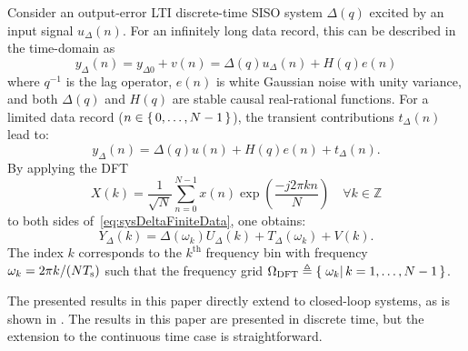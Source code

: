 Consider an output-error \gls{LTI} discrete-time \gls{SISO} system $\Delta(q)$ excited by an input signal $u_{\Delta}(n)$.
For an infinitely long data record, this can be described in the time-domain as
\begin{equation}
  y_{\Delta}(n) 
    = 
      y_{\Delta0}
      + v(n) 
    = 
      \Delta(q)u_{\Delta}(n) 
      + H(q)e(n)
  \label{eq:sysDeltaInfData}
\end{equation}
where $q^{-1}$ is the lag operator, $e(n)$ is white Gaussian noise with unity variance, and both $\Delta(q)$ and $H(q)$ are stable causal real-rational functions.
For a limited data record ($n \in \set{0,\ldots,N-1}$), the transient contributions $t_{\Delta}(n)$ lead to:
\begin{equation}
    y_{\Delta}(n) 
      = 
        \Delta(q)u(n) 
        + H(q)e(n) 
        + t_{\Delta}(n)
    \text{.}
    \label{eq:sysDeltaFiniteData}
\end{equation}
By applying the \gls{DFT}
\begin{equation}
  X(k) 
       = 
         \frac{1}
              {\sqrt{N}} 
         \sum_{n=0}^{N-1} 
            x(n) \exp \left( \frac{- j 2 \pi k n }{N} \right)
         \quad   
         \forall k \in \mathbb{Z}
  \label{eq:DFT}
\end{equation} 
to both sides of~\eqref{eq:sysDeltaFiniteData}, one obtains:
\begin{equation}
  Y_{\Delta}(k) 
                = 
                  \Delta(\omega_k) U_{\Delta}(k) 
                  + T_{\Delta}(\omega_k) 
                  + V(k) 
  \text{.}
  \label{eq:sysDeltaFiniteDataFD}
\end{equation}
The index $k$ corresponds to the $k^{\text{th}}$ frequency bin with frequency $\omega_{k} = 2\pi k / (N T_{\mathrm{s}})$ such that the frequency grid $\Omega_{\mathrm{DFT}} \triangleq \set{\left.\omega_k \right| k = 1,\ldots,N-1}$.

The presented results in this paper directly extend to closed-loop systems, as is shown in .
The results in this paper are presented in discrete time, but the extension to the continuous time case is straightforward.

